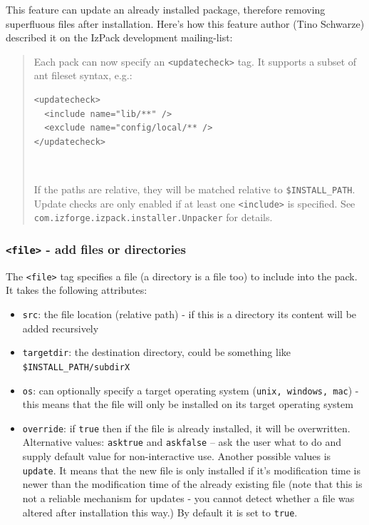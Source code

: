 This feature can update an already installed package, therefore removing
superfluous files after installation. Here's how this feature author (Tino Schwarze)
described it on the IzPack development mailing-list:
\begin{quote}
Each pack can now
specify an \texttt{<updatecheck>} tag. It supports a subset of ant fileset
syntax, e.g.:
\begin{verbatim}
<updatecheck>
  <include name="lib/**" />
  <exclude name="config/local/** />
</updatecheck>
\end{verbatim}\

If the paths are relative, they will be matched relative to
\texttt{\$INSTALL\_PATH}. Update checks are only enabled if at least one
\texttt{<include>} is specified. See
\texttt{com.izforge.izpack.installer.Unpacker} for details.
\end{quote}

\subsubsection{\label{tag:file}\texttt{<file>} - add files or directories}

The \texttt{<file>} tag specifies a file (a directory is a file too) to 
include into the pack. It takes the following attributes:

\begin{itemize}

  \item \texttt{src}: the file location (relative path) - if this is a
  directory its content will be added recursively

  \item \texttt{targetdir}: the destination directory, could be something like
  \texttt{\$INSTALL\_PATH/subdirX}

  \item \texttt{os}: can optionally specify a target operating system
  (\texttt{unix, windows, mac}) - this means that the file will only be
  installed on its target operating system

  \item \texttt{override}: if \texttt{true} then if the file is already
  installed, it will be overwritten. Alternative values: \texttt{asktrue} and
  \texttt{askfalse} -- ask the user what to do and supply default value for
  non-interactive use. Another possible values is \texttt{update}. It means
  that the new file is only installed if it's modification time is newer than
  the modification time of the already existing file (note that this is not a
  reliable mechanism for updates - you cannot detect whether a file was
  altered after installation this way.) By default it is set to \texttt{true}.

\end{itemize}
